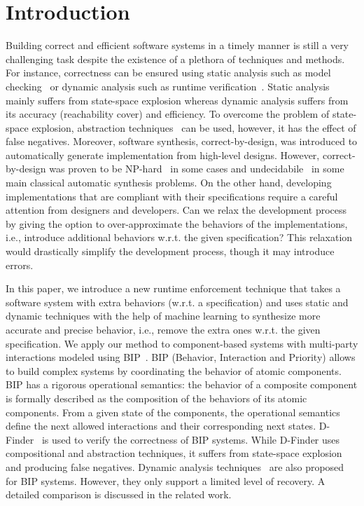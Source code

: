 \section{Introduction}
Building correct and efficient software systems in a timely manner is still a very challenging task despite the existence of a plethora of techniques and methods. For instance, correctness can be ensured using static analysis such as model checking~\cite{Clarke09,ClarkeKNZ11,QueilleS82} or dynamic analysis such as runtime verification~\cite{rvylies}. Static analysis mainly suffers from state-space explosion whereas dynamic analysis suffers from its accuracy (reachability cover) and efficiency.  To overcome the problem of state-space explosion, abstraction techniques~\cite{FlanaganQ02} can be used, however, it has the effect of false negatives. Moreover, software synthesis, correct-by-design, was introduced to automatically generate implementation from high-level designs. However, correct-by-design was proven to be NP-hard~\cite{PnueliR89} in some cases and undecidabile~\cite{PnueliR90} in some main classical automatic synthesis problems. 
%
On the other hand, developing implementations that are compliant with their specifications require a careful attention from designers and developers. Can we relax the development process by giving the option to over-approximate the behaviors of the implementations, i.e., introduce additional behaviors w.r.t. the given specification? This relaxation would drastically simplify the development process, though it may introduce errors. 

%
In this paper, we introduce a new runtime enforcement technique that takes a software system with extra behaviors (w.r.t. a specification) and uses static and dynamic techniques with the help of machine learning to synthesize more accurate and precise behavior, i.e., remove the extra ones w.r.t. the given specification. 
%
We apply our method to component-based systems with multi-party interactions modeled using BIP~\cite{bip2}. 
BIP (Behavior, Interaction and Priority) allows to build complex systems by coordinating the behavior of atomic components. BIP has a rigorous operational semantics: the behavior of a composite component is formally
described as the composition of the behaviors of its atomic components. From a given state of the components, the operational semantics define the next allowed interactions and their corresponding next states.
D-Finder~\cite{BensalemBNS09} is used to verify the correctness of BIP systems. While D-Finder uses compositional and abstraction techniques, it suffers from state-space explosion and producing false negatives. Dynamic analysis techniques~\cite{FalconeJNBB15,CharafeddineEFJ15} are also proposed for BIP systems. However, they only support a limited level of recovery. A detailed comparison is discussed in the related work. 


